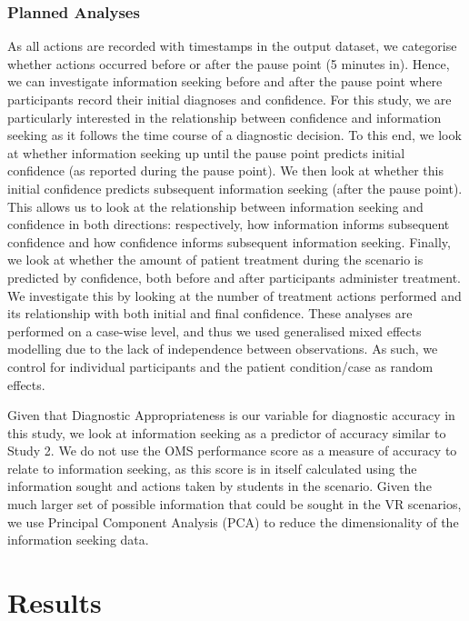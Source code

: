 \documentclass[a4paper, nobind]{templates/ociamthesis}
\begin{document}
\subsubsection*{Planned Analyses}\label{planned-analyses}

As all actions are recorded with timestamps in the output dataset, we categorise whether actions occurred before or after the pause point (5 minutes in). Hence, we can investigate information seeking before and after the pause point where participants record their initial diagnoses and confidence. For this study, we are particularly interested in the relationship between confidence and information seeking as it follows the time course of a diagnostic decision. To this end, we look at whether information seeking up until the pause point predicts initial confidence (as reported during the pause point). We then look at whether this initial confidence predicts subsequent information seeking (after the pause point). This allows us to look at the relationship between information seeking and confidence in both directions: respectively, how information informs subsequent confidence and how confidence informs subsequent information seeking. Finally, we look at whether the amount of patient treatment during the scenario is predicted by confidence, both before and after participants administer treatment. We investigate this by looking at the number of treatment actions performed and its relationship with both initial and final confidence. These analyses are performed on a case-wise level, and thus we used generalised mixed effects modelling due to the lack of independence between observations. As such, we control for individual participants and the patient condition/case as random effects.

\hfill\break
Given that Diagnostic Appropriateness is our variable for diagnostic accuracy in this study, we look at information seeking as a predictor of accuracy similar to Study 2. We do not use the OMS performance score as a measure of accuracy to relate to information seeking, as this score is in itself calculated using the information sought and actions taken by students in the scenario. Given the much larger set of possible information that could be sought in the VR scenarios, we use Principal Component Analysis (PCA) to reduce the dimensionality of the information seeking data.

\section*{Results}\label{results-3}
\end{document}
